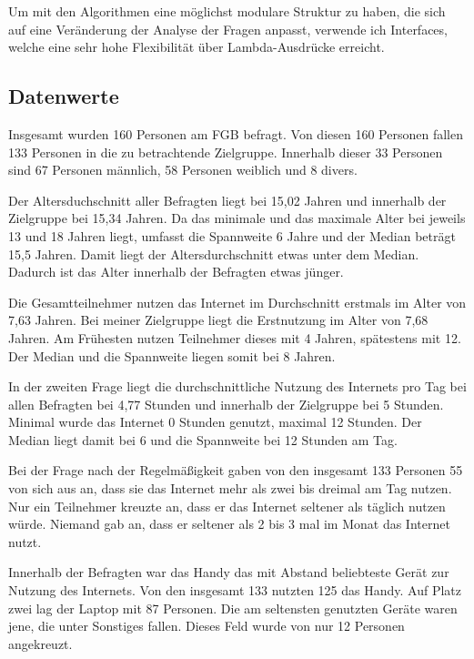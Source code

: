 Um mit den Algorithmen eine möglichst modulare Struktur zu haben, die sich auf eine Veränderung der Analyse der Fragen anpasst, 
verwende ich Interfaces, welche eine sehr hohe Flexibilität über Lambda-Ausdrücke erreicht.

\subsection{Datenwerte}

Insgesamt wurden 160 Personen am FGB befragt. Von diesen 160 Personen fallen 133 Personen in die zu betrachtende Zielgruppe.
Innerhalb dieser 33 Personen sind 67 Personen männlich, 58 Personen weiblich und 8 divers.

Der Altersduchschnitt aller Befragten liegt bei 15,02 Jahren und innerhalb der Zielgruppe bei 15,34 Jahren. Da das minimale und das
maximale Alter bei jeweils 13 und 18 Jahren liegt, umfasst die Spannweite 6 Jahre und der Median beträgt 15,5 Jahren. Damit liegt 
der Altersdurchschnitt etwas unter dem Median. Dadurch ist das Alter innerhalb der Befragten etwas jünger. 

Die Gesamtteilnehmer nutzen das Internet im Durchschnitt erstmals im Alter von 7,63 Jahren. Bei meiner Zielgruppe liegt die Erstnutzung 
im Alter von 7,68 Jahren. Am Frühesten nutzen Teilnehmer dieses mit 4 Jahren, spätestens mit 12. Der Median und die Spannweite liegen somit bei 8 
Jahren.

In der zweiten Frage liegt die durchschnittliche Nutzung des Internets pro Tag bei allen Befragten bei 4,77 Stunden und innerhalb der 
Zielgruppe bei 5 Stunden. Minimal wurde das Internet 0 Stunden genutzt, maximal 12 Stunden. Der Median liegt damit bei 6 und die 
Spannweite bei 12 Stunden am Tag.

Bei der Frage nach der Regelmäßigkeit gaben von den insgesamt 133 Personen 55 von sich aus an, dass sie das Internet mehr als zwei 
bis dreimal am Tag nutzen. Nur ein Teilnehmer kreuzte an, dass er das Internet seltener als täglich nutzen würde. Niemand gab an, 
dass er seltener als 2 bis 3 mal im Monat das Internet nutzt.

Innerhalb der Befragten war das Handy das mit Abstand beliebteste Gerät zur Nutzung des Internets. Von den insgesamt 133 nutzten 
125 das Handy. Auf Platz zwei lag der Laptop mit 87 Personen. Die am seltensten genutzten Geräte waren jene, die unter Sonstiges
fallen. Dieses Feld wurde von nur 12 Personen angekreuzt.

